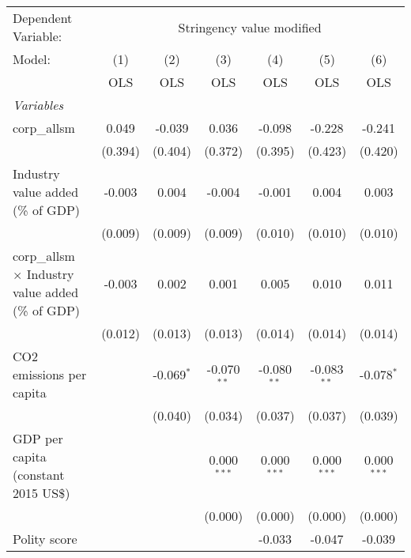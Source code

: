 
\begingroup
\centering
\begin{tabular}{lcccccc}
   \toprule
   Dependent Variable: & \multicolumn{6}{c}{Stringency value modified}\\
   Model:                                                   & (1)     & (2)          & (3)           & (4)           & (5)           & (6)\\  
                                                            &  OLS    & OLS          & OLS           & OLS           & OLS           & OLS\\  
   \midrule
   \emph{Variables}\\
   corp\_allsm                                              & 0.049   & -0.039       & 0.036         & -0.098        & -0.228        & -0.241\\   
                                                            & (0.394) & (0.404)      & (0.372)       & (0.395)       & (0.423)       & (0.420)\\   
   Industry value added (\% of GDP)                         & -0.003  & 0.004        & -0.004        & -0.001        & 0.004         & 0.003\\   
                                                            & (0.009) & (0.009)      & (0.009)       & (0.010)       & (0.010)       & (0.010)\\   
   corp\_allsm $\times$ Industry value added (\% of GDP)    & -0.003  & 0.002        & 0.001         & 0.005         & 0.010         & 0.011\\   
                                                            & (0.012) & (0.013)      & (0.013)       & (0.014)       & (0.014)       & (0.014)\\   
   CO2 emissions per capita                                 &         & -0.069$^{*}$ & -0.070$^{**}$ & -0.080$^{**}$ & -0.083$^{**}$ & -0.078$^{*}$\\   
                                                            &         & (0.040)      & (0.034)       & (0.037)       & (0.037)       & (0.039)\\   
   GDP per capita (constant 2015 US\$)                      &         &              & 0.000$^{***}$ & 0.000$^{***}$ & 0.000$^{***}$ & 0.000$^{***}$\\   
                                                            &         &              & (0.000)       & (0.000)       & (0.000)       & (0.000)\\   
   Polity score                                             &         &              &               & -0.033        & -0.047        & -0.039\\   

\end{tabular}

